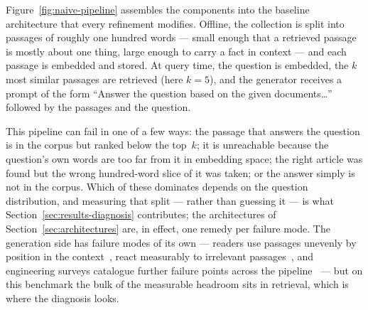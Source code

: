 Figure~\ref{fig:naive-pipeline} assembles the components into the baseline
architecture that every refinement modifies. Offline, the collection is
split into passages of roughly one hundred words --- small enough that a
retrieved passage is mostly about one thing, large enough to carry a fact
in context --- and each passage is embedded and stored. At query time, the
question is embedded, the $k$ most similar passages are retrieved (here
$k=5$), and the generator receives a prompt of the form ``Answer the
question based on the given documents\ldots'' followed by the passages and
the question.

This pipeline can fail in one of a few ways: the passage that answers the
question is in the corpus but ranked below the top~$k$; it is unreachable because the question's own words are
too far from it in embedding space; the right article was found but the
wrong hundred-word slice of it was taken; or the answer simply is not in
the corpus. Which of these dominates depends on the question distribution,
and measuring that split --- rather than guessing it --- is what
Section~\ref{sec:results-diagnosis} contributes; the architectures of
Section~\ref{sec:architectures} are, in effect, one remedy per failure
mode. The generation side has failure modes of its own --- readers use
passages unevenly by position in the context~\citep{liu2024lost}, react
measurably to irrelevant passages~\citep{cuconasu2024noise}, and
engineering surveys catalogue further failure points across the
pipeline~\citep{barnett2024seven} --- but on this benchmark the bulk of
the measurable headroom sits in retrieval, which is where the diagnosis
looks.
